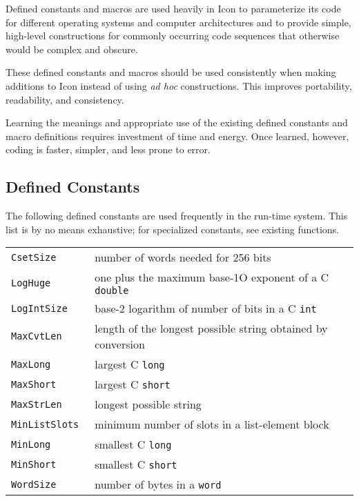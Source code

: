 Defined constants and macros are used heavily in Icon to parameterize
its code for different operating systems and computer architectures
and to provide simple, high-level constructions for commonly occurring
code sequences that otherwise would be complex and obscure.

These defined constants and macros should be used consistently when
making additions to Icon instead of using \textit{ad hoc}
constructions. This improves portability, readability, and
consistency.

Learning the meanings and appropriate use of the existing defined
constants and macro definitions requires investment of time and
energy. Once learned, however, coding is faster, simpler, and less
prone to error.

\subsection{Defined Constants}

The following defined constants are used frequently in the run-time
system. This list is by no means exhaustive; for specialized
constants, see existing functions.\\[1ex]

{\renewcommand{\arraystretch}{0.9}%
\begin{xtabular}{>{\hspace{1cm}\texttt\bgroup}l<{\egroup}@{\hspace{1cm}}p{11cm}}
CsetSize     & number of words needed for 256 bits\\
LogHuge      & one plus the maximum base-1O exponent of a C \texttt{double}\\
LogIntSize   & base-2 logarithm of number of bits in a C \texttt{int}\\
MaxCvtLen    & length of the longest possible string obtained by conversion\\
MaxLong      & largest C \texttt{long}\\
MaxShort     & largest C \texttt{short}\\
MaxStrLen    & longest possible string\\
MinListSlots & minimum number of slots in a list-element block\\
MinLong      & smallest C \texttt{long}\\
MinShort     & smallest C \texttt{short}\\
WordSize     & number of bytes in a \texttt{word}\\
\end{xtabular}
}\\[1ex]

